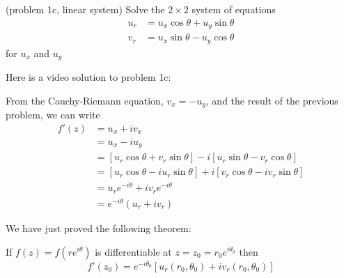 \documentclass[handout]{ximera}
\begin{document}
\begin{problem}(problem 1c, linear system)
 Solve the $2 \times 2$ system of equations
\begin{align*}
u_r &= u_x \cos \theta + u_y \sin\theta\\
v_r &= u_x \sin \theta -u_y \cos\theta
\end{align*}
for $u_x$ and $u_y$
\begin{multipleChoice}
\end{multipleChoice}
\end{problem}

Here is a video solution to problem 1c:\\
\begin{foldable}
\end{foldable}


From the Cauchy-Riemann equation, $v_x = -u_y$, and the result of the previous problem, we can write
\begin{align*}
f'(z) &= u_x + iv_x\\
      & = u_x - iu_y\\
      &= \left[u_r \cos \theta + v_r \sin \theta\right] - i\left[ u_r \sin \theta - v_r \cos \theta \right]\\
      &= \left[u_r \cos \theta -i u_r \sin \theta\right] + i\left[ v_r \cos \theta  - iv_r \sin \theta\right]\\
      &= u_r e^{-i\theta} + iv_r e^{-i\theta}\\
      &=  e^{-i\theta}(u_r +iv_r)
\end{align*}

We have just proved the following theorem:

\begin{theorem}
If $f(z) = f\left(re^{i\theta}\right)$ is differentiable at $z = z_0 = r_0 e^{i\theta_0}$ then
\[
f'(z_0) = e^{-i\theta_0} \left[u_r(r_0, \theta_0) + iv_r(r_0, \theta_0)\right]
\]
\end{theorem}
\end{document}
